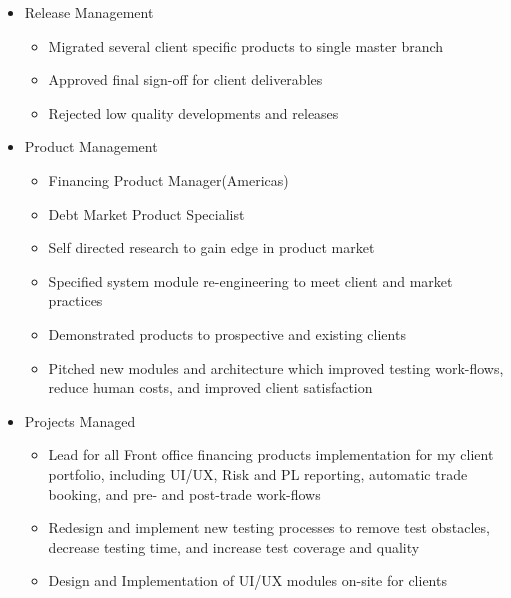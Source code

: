 \begin{itemize}
    \item{Release Management}
        \begin{itemize}
            \item Migrated several client specific products to single master branch
            \item Approved final sign-off for client deliverables
            \item Rejected low quality developments and releases
        \end{itemize}

    \item{Product Management}
        \begin{itemize}
            \item Financing Product Manager(Americas)
            \item Debt Market Product Specialist 
            \item Self directed research to gain edge in product market
            \item Specified system module re-engineering to meet client and market practices
            \item Demonstrated products to prospective and existing clients
            \item Pitched new modules and architecture which improved testing work-flows, reduce human costs, and improved client satisfaction
        \end{itemize}

    \item{Projects Managed\footnotemark}
        \begin{itemize}
            \item Lead for all Front office financing products implementation for my client portfolio, including UI/UX, Risk and PL reporting, automatic trade booking, and pre- and post-trade work-flows
            \item Redesign and implement new testing processes to remove test obstacles, decrease testing time, and increase test coverage and quality
            \item Design and Implementation of UI/UX modules on-site for clients
        \end{itemize}


\end{itemize}
